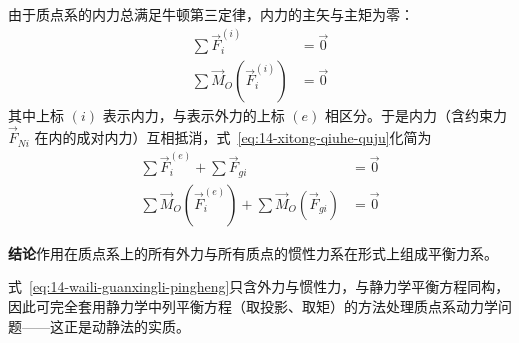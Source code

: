 由于质点系的内力总满足牛顿第三定律，内力的主矢与主矩为零：
\begin{equation}\label{eq:14-neili-weiling}
  \begin{aligned}
    \sum \vec{F}_i^{(i)} &= \vec{0} \\
    \sum \vec{M}_O\!\left(\vec{F}_i^{(i)}\right) &= \vec{0}
  \end{aligned}
\end{equation}
其中上标 $(i)$ 表示内力，与表示外力的上标 $(e)$ 相区分。于是内力（含约束力 $\vec{F}_{Ni}$ 在内的成对内力）互相抵消，式~\eqref{eq:14-xitong-qiuhe-quju}化简为
\begin{equation}\label{eq:14-waili-guanxingli-pingheng}
  \begin{aligned}
    \sum \vec{F}_i^{(e)} + \sum \vec{F}_{gi} &= \vec{0} \\
    \sum \vec{M}_O\!\left(\vec{F}_i^{(e)}\right) + \sum \vec{M}_O\!\left(\vec{F}_{gi}\right) &= \vec{0}
  \end{aligned}
\end{equation}

\begin{keybox}
\textbf{结论}\quad 作用在质点系上的所有外力与所有质点的惯性力系在形式上组成平衡力系。
\end{keybox}

\begin{remark}
式~\eqref{eq:14-waili-guanxingli-pingheng}只含外力与惯性力，与静力学平衡方程同构，因此可完全套用静力学中列平衡方程（取投影、取矩）的方法处理质点系动力学问题——这正是动静法的实质。
\end{remark}
